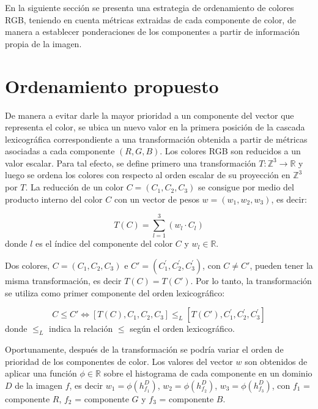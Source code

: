 En la siguiente secci\'on se presenta una estrategia de ordenamiento de colores RGB, teniendo en cuenta m\'etricas extraidas de cada componente de color, de manera a establecer ponderaciones de los componentes a partir de informaci\'on propia de la imagen.



 \section{Ordenamiento propuesto}

De manera a evitar darle la mayor prioridad a un componente del vector que representa el color, se ubica un nuevo valor en la primera posici\'on de la cascada lexicogr\'afica correspondiente a una transformaci\'on obtenida a partir de m\'etricas asociadas a cada componente $(R,G,B)$.
Los colores RGB son reducidos a un valor escalar. Para tal efecto, se define primero una transformaci\'on $T:\mathbb{Z}^3 \rightarrow \mathbb{R}$ y luego se ordena los colores con respecto al orden escalar de su proyecci\'on en $\mathbb{Z}^3$ por $T$.
La reducci\'on de un color $
C=(C_1,C_2,C_3)$ se consigue por medio del producto interno del color $C$ con un vector de pesos $w=(w_1,w_2,w_3) $, es decir:

\begin{equation}
\label{Transformacion}
T(C)= \sum_{l=1}^3(w_l \cdot C_l)
\end{equation}  
donde $l$ es el \'indice del componente del color $C$ y $w_l \in \mathbb{R}$. 

Dos colores, $C=(C_1,C_2,C_3)$ e $C'=(C_1^{'},C_2^{'},C_3^{'})$, con $C\neq C'$, pueden tener la misma transformaci\'on, es decir $T(C) = T(C')$.  Por lo tanto, la transformaci\'on se utiliza como primer componente del orden lexicogr\'afico:

\begin{equation}
\label{Mio} 
 C\leq C'\Leftrightarrow [T(C),C_1,C_2,C_3] \leq_L [T(C'),C_1^{'},C_2^{'},C_3^{'}]
\end{equation} donde $\leq_L$ indica la relación $\leq$ según el orden lexicográfico.	

Oportunamente, despu\'es de la transformaci\'on se podr\'ia variar el orden de prioridad de los componentes de color.
Los valores del vector $w$ son obtenidos de aplicar una funci\'on $\phi \in \mathbb{R}$ sobre el histograma de cada componente en un dominio $D$ de la imagen $f$, es decir $w_1 = \phi(h_{f_1}^D)$, $w_2 = \phi(h_{f_2}^D)$, $w_3 = \phi(h_{f_3}^D)$, con $f_1$ = componente $R$, $f_2$ = componente $G$ y $f_3$ =  componente $B$.

